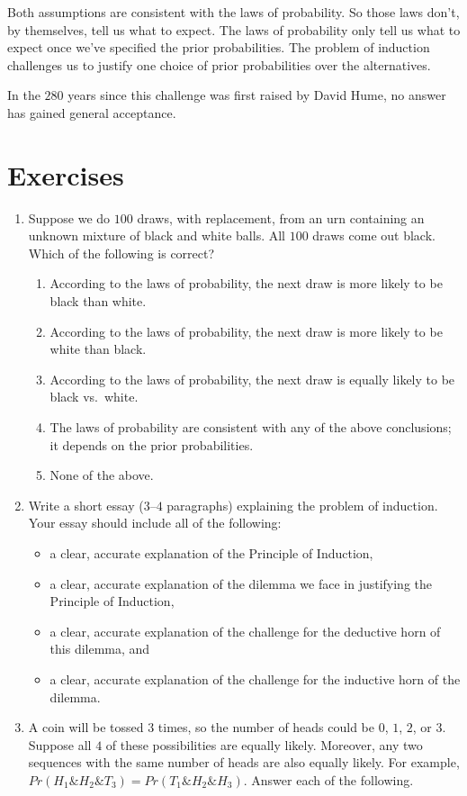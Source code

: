 \documentclass[justified]{tufte-book}
\providecommand{\tightlist}{%
  \setlength{\itemsep}{0pt}\setlength{\parskip}{0pt}}
\renewcommand{\wedge}{\mathbin{\&}}
\newcommand{\p}{Pr}
\begin{document}
Both assumptions are consistent with the laws of probability. So those laws don't, by themselves, tell us what to expect. The laws of probability only tell us what to expect once we've specified the prior probabilities. The problem of induction challenges us to justify one choice of prior probabilities over the alternatives.

In the \(280\) years since this challenge was first raised by David Hume, no answer has gained general acceptance.

\hypertarget{exercises-1}{%
\section*{Exercises}\label{exercises-1}}

\begin{enumerate}
\def\labelenumi{\arabic{enumi}.}
\item
  Suppose we do \(100\) draws, with replacement, from an urn containing an unknown mixture of black and white balls. All \(100\) draws come out black. Which of the following is correct?

  \begin{enumerate}
  \def\labelenumii{\alph{enumii}.}
  \tightlist
  \item
    According to the laws of probability, the next draw is more likely to be black than white.
  \item
    According to the laws of probability, the next draw is more likely to be white than black.
  \item
    According to the laws of probability, the next draw is equally likely to be black vs.~white.
  \item
    The laws of probability are consistent with any of the above conclusions; it depends on the prior probabilities.
  \item
    None of the above.
  \end{enumerate}
\item
  Write a short essay (\(3\)--\(4\) paragraphs) explaining the problem of induction. Your essay should include all of the following:

  \begin{itemize}
  \tightlist
  \item
    a clear, accurate explanation of the Principle of Induction,
  \item
    a clear, accurate explanation of the dilemma we face in justifying the Principle of Induction,
  \item
    a clear, accurate explanation of the challenge for the deductive horn of this dilemma, and
  \item
    a clear, accurate explanation of the challenge for the inductive horn of the dilemma.
  \end{itemize}
\item
  A coin will be tossed \(3\) times, so the number of heads could be \(0\), \(1\), \(2\), or \(3\). Suppose all \(4\) of these possibilities are equally likely. Moreover, any two sequences with the same number of heads are also equally likely. For example, \(\p(H_1 \wedge H_2 \wedge T_3) = \p(T_1 \wedge H_2 \wedge H_3)\). Answer each of the following.


\end{enumerate}
\end{document}
